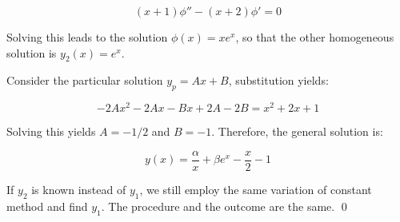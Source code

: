 \documentclass[12pt]{article}
\begin{document}
\begin{equation}
    (x + 1)\phi'' - (x + 2)\phi' = 0
\end{equation}

Solving this leads to the solution $\phi(x) = xe^{x}$, so that the other homogeneous solution is $y_{2}(x) = e^{x}$.

Consider the particular solution $y_{p} = Ax + B$, substitution yields:

\begin{equation}
    -2Ax^{2} - 2Ax - Bx + 2A - 2B = x^{2} + 2x + 1
\end{equation}

Solving this yields $A = -1/2$ and $B = -1$. Therefore, the general solution is:

\begin{equation}
    y(x) = \frac{\alpha}{x} + \beta e^{x} - \frac{x}{2} - 1
\end{equation}

If $y_{2}$ is known instead of $y_{1}$, we still employ the same variation of constant method and find $y_{1}$. The procedure and the outcome are the same.
\qed
\end{document}
